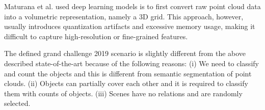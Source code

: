 Maturana et al. \cite{DBLP:conf/iros/MaturanaS15} used deep learning models is to first convert raw point cloud data into a
volumetric representation, namely a 3D grid. This approach, however, usually introduces quantization artifacts and excessive memory usage, making it difficult 
to capture high-resolution or fine-grained features.


The defined grand challenge 2019 \cite{DEBSGC2019} scenario 
is slightly different from
the above described state-of-the-art because of the following reasons: (i) We need to classify and
count the objects and this is different from semantic segmentation of point clouds. (ii) Objects
can partially cover each other and it is required to classify them with counts of objects.
(iii) Scenes have no relations and are randomly selected.










